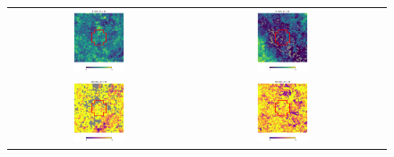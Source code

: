 \documentclass[preprintm,linenumbers]{aastex631}
\begin{document}
\begin{figure}
\begin{tabular}{  c c c}
				\includegraphics[width=0.3\textwidth]{results/skymaps_cutout/skymaps_cutout_first_year_one_snap_v4_0_10yrs_db_noDD_noTwi_tscale-3_nside-256_doAllTemplateMetrics_reduceCount_r_WFD_noDD_noTwi.pdf} &
				\includegraphics[width=0.3\textwidth]{results/skymaps_cutout/skymaps_cutout_first_year_one_snap_v4_0_10yrs_db_noDD_noTwi_tscale-3_nside-256_doAllTemplateMetrics_reduceCount_r_GP_noDD_noTwi.pdf} \\
				\includegraphics[width=0.3\textwidth]{results/skymaps_cutout/skymaps_cutout_delta_first_year_one_snap_v4_0_10yrs_db_noDD_noTwi_tscale-3_nside-256_doAllTemplateMetrics_reduceCount_r_NES_noDD_noTwi.pdf} &
				\includegraphics[width=0.3\textwidth]{results/skymaps_cutout/skymaps_cutout_delta_first_year_one_snap_v4_0_10yrs_db_noDD_noTwi_tscale-3_nside-256_doAllTemplateMetrics_reduceCount_r_WFD_noDD_noTwi.pdf} &

\end{tabular}
\end{figure}
\end{document}
